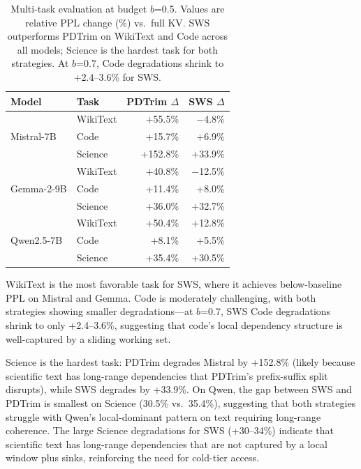 \documentclass[11pt]{article}
\newcommand{\sws}{SWS}
\newcommand{\pct}{\%}
\theoremstyle{definition}
\theoremstyle{plain}
\begin{document}
\begin{table}[t]
\centering
\caption{Multi-task evaluation at budget $b$=0.5.  Values are relative PPL change (\%) vs.\ full KV.  \sws{} outperforms PDTrim on WikiText and Code across all models; Science is the hardest task for both strategies.  At $b$=0.7, Code degradations shrink to +2.4--3.6\pct{} for \sws{}.}
\label{tab:multitask}
\small
\begin{tabular}{llrr}
\toprule
Model & Task & PDTrim $\Delta$ & \sws{} $\Delta$ \\
\midrule
\multirow{3}{*}{Mistral-7B} 
 & WikiText & +55.5\pct{} & $-$4.8\pct{} \\
 & Code & +15.7\pct{} & +6.9\pct{} \\
 & Science & +152.8\pct{} & +33.9\pct{} \\
\midrule
\multirow{3}{*}{Gemma-2-9B} 
 & WikiText & +40.8\pct{} & $-$12.5\pct{} \\
 & Code & +11.4\pct{} & +8.0\pct{} \\
 & Science & +36.0\pct{} & +32.7\pct{} \\
\midrule
\multirow{3}{*}{Qwen2.5-7B} 
 & WikiText & +50.4\pct{} & +12.8\pct{} \\
 & Code & +8.1\pct{} & +5.5\pct{} \\
 & Science & +35.4\pct{} & +30.5\pct{} \\
\bottomrule
\end{tabular}
\end{table}

WikiText is the most favorable task for \sws{}, where it achieves below-baseline PPL on Mistral and Gemma.  Code is moderately challenging, with both strategies showing smaller degradations---at $b$=0.7, \sws{} Code degradations shrink to only +2.4--3.6\pct{}, suggesting that code's local dependency structure is well-captured by a sliding working set.

Science is the hardest task: PDTrim degrades Mistral by +152.8\pct{} (likely because scientific text has long-range dependencies that PDTrim's prefix-suffix split disrupts), while \sws{} degrades by +33.9\pct{}.  On Qwen, the gap between \sws{} and PDTrim is smallest on Science (30.5\pct{} vs.\ 35.4\pct{}), suggesting that both strategies struggle with Qwen's local-dominant pattern on text requiring long-range coherence.  The large Science degradations for \sws{} (+30--34\pct{}) indicate that scientific text has long-range dependencies that are not captured by a local window plus sinks, reinforcing the need for cold-tier access.
\end{document}
